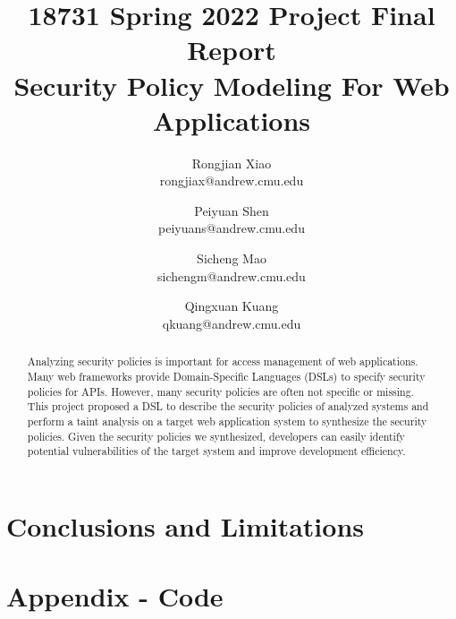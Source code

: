 \documentclass[twocolumn,10pt]{article}
\begin{document}
\title{18731 Spring 2022 Project Final Report\\
  Security Policy Modeling For Web Applications}

\author{
  Rongjian Xiao \\ rongjiax@andrew.cmu.edu \and
  Peiyuan Shen \\ peiyuans@andrew.cmu.edu \and
  Sicheng Mao \\ sichengm@andrew.cmu.edu \and
  Qingxuan Kuang \\ qkuang@andrew.cmu.edu
}

\maketitle

\begin{abstract}

  Analyzing security policies is important for access management of web
  applications.
  Many web frameworks provide Domain-Specific Languages (DSLs) to specify
  security policies for APIs.
  However, many security policies are often not specific or missing.
  This project proposed a DSL to describe the security policies of analyzed
  systems and perform a taint analysis on a target web application system to
  synthesize the security policies.
  Given the security policies we synthesized, developers can easily identify
  potential vulnerabilities of the target system and improve development
  efficiency.

\end{abstract}






\section{Conclusions and Limitations}%

 {
  \footnotesize
  \raggedright
  
  
 }

\newpage
\onecolumn
\section{Appendix - Code}
\end{document}
